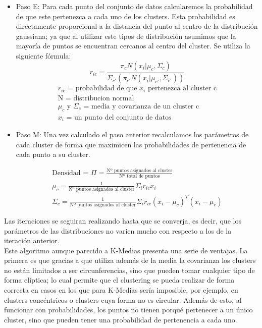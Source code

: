 \documentclass[conference,a4paper]{IEEEtran}
\begin{document}
\begin{itemize}
	\item Paso E: Para cada punto del conjunto de datos calcularemos la probabilidad de que este pertenezca a cada uno de los clusters. Esta probabilidad es directamente proporcional a la distancia del punto al centro de la distribución gaussiana; ya que al utilizar este tipos de distribución asumimos que la mayoría de puntos se encuentran cercanos al centro del cluster. Se utiliza la siguiente fórmula:\\
\[r_{ic}=\frac{\pi_{c}N(x_{i}|\mu_{c},\varSigma_{c})}{\Sigma_{c'}(\pi_{c'}N(x_{i}|\mu_{c'},\varSigma_{c'}))}\]
\begin{gather}
r_{ic} \text{ = probabilidad de que } x_{i} \text{ pertenezca al cluster c} \\
\text{N = distribucion normal} \\
\mu_{c} \text{ y } \varSigma_{c} \text{ = media y covarianza de un cluster c} \\
x_{i} \text{ = un punto del conjunto de datos}
\end{gather}

	\item Paso M: Una vez calculado el paso anterior recalculamos los parámetros de cada cluster de forma que maximicen las probabilidades de pertenencia de cada punto a su cluster.

\begin{gather}
\text{Densidad = } \Pi=\frac{\text{Nº puntos asignados al cluster}}{\text{Nº total de puntos}} \\
\mu_{c}=\frac{1}{\text{Nº puntos asignados al cluster}}\Sigma_{i}r_{ic}x_{i}\\
\varSigma_{c}=\frac{1}{\text{Nº puntos asignados al cluster}}\Sigma_{i}r_{ic}(x_{i}-\mu_{c})^T(x_{i}-\mu_{c})
\end{gather}

\end{itemize}

Las iteraciones se seguiran realizando hasta que se converja, es decir, que los parámetros de las distribuciones no varien mucho con respecto a los de la iteración anterior.\\

Este algoritmo aunque parecido a K-Medias presenta una serie de ventajas. La primera es que gracias a que utiliza además de la media la covarianza los clusters no están limitados a ser circunferencias, sino que pueden tomar cualquier tipo de forma elíptica; lo cual permite que el clustering se pueda realizar de forma correcta en casos en los que para K-Medias sería imposible, por ejemplo, en clusters concéntricos o clusters cuya forma no es circular. Además de esto, al funcionar con probabilidades, los puntos no tienen porqué pertenecer a un único cluster, sino que pueden tener una probabilidad de pertenencia a cada uno.
\end{document}
